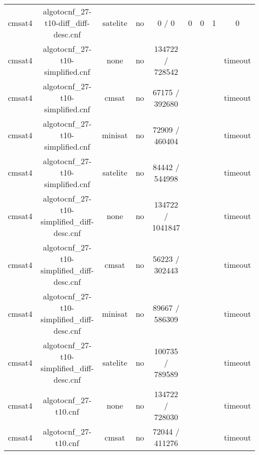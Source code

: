 \begin{appendices}
\begin{table}[p]
\begin{center}
\begin{tabular}{l|cccccccc}
  cmsat4                         & algotocnf\_27-t10-diff\_diff-desc.cnf & satelite   & no    & 0 / 0      & 0         & 0         & 1          & 0 \\ %
  cmsat4                         & algotocnf\_27-t10-simplified.cnf & none       & no    & 134722 / 728542 &           &           &            & timeout \\ %
  cmsat4                         & algotocnf\_27-t10-simplified.cnf & cmsat      & no    & 67175 / 392680 &           &           &            & timeout \\ %
  cmsat4                         & algotocnf\_27-t10-simplified.cnf & minisat    & no    & 72909 / 460404 &           &           &            & timeout \\ %
  cmsat4                         & algotocnf\_27-t10-simplified.cnf & satelite   & no    & 84442 / 544998 &           &           &            & timeout \\ %
  cmsat4                         & algotocnf\_27-t10-simplified\_diff-desc.cnf & none       & no    & 134722 / 1041847 &           &           &            & timeout \\ %
  cmsat4                         & algotocnf\_27-t10-simplified\_diff-desc.cnf & cmsat      & no    & 56223 / 302443 &           &           &            & timeout \\ %
  cmsat4                         & algotocnf\_27-t10-simplified\_diff-desc.cnf & minisat    & no    & 89667 / 586309 &           &           &            & timeout \\ %
  cmsat4                         & algotocnf\_27-t10-simplified\_diff-desc.cnf & satelite   & no    & 100735 / 789589 &           &           &            & timeout \\ %
  cmsat4                         & algotocnf\_27-t10.cnf          & none       & no    & 134722 / 728030 &           &           &            & timeout \\ %
  cmsat4                         & algotocnf\_27-t10.cnf          & cmsat      & no    & 72044 / 411276 &           &           &            & timeout \\ %

\end{tabular}
\end{center}
\end{table}
\end{appendices}
